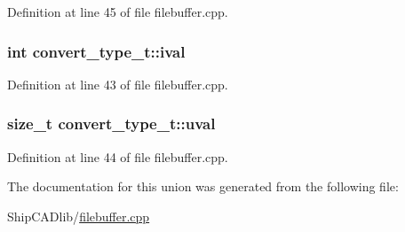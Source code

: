 Definition at line 45 of file filebuffer.\-cpp.

\hypertarget{unionconvert__type__t_a9eef931dacbc2c9fe0b67edc5e053624}{
\subsubsection[{ival}]{\setlength{\rightskip}{0pt plus 5cm}int convert\-\_\-type\-\_\-t\-::ival}}\label{unionconvert__type__t_a9eef931dacbc2c9fe0b67edc5e053624}


Definition at line 43 of file filebuffer.\-cpp.

\hypertarget{unionconvert__type__t_ab2a3ae21cfb1610cc473234ce3e7661e}{
\subsubsection[{uval}]{\setlength{\rightskip}{0pt plus 5cm}size\-\_\-t convert\-\_\-type\-\_\-t\-::uval}}\label{unionconvert__type__t_ab2a3ae21cfb1610cc473234ce3e7661e}


Definition at line 44 of file filebuffer.\-cpp.



The documentation for this union was generated from the following file\-:\begin{DoxyCompactItemize}
\item 
Ship\-C\-A\-Dlib/\hyperlink{filebuffer_8cpp}{filebuffer.\-cpp}\end{DoxyCompactItemize}
